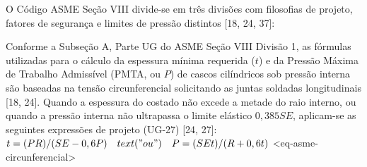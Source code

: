 O Código ASME Seção VIII divide-se em três divisões com filosofias de projeto, fatores de segurança e limites de pressão distintos [18, 24, 37]:

%
%
%
%
%

Conforme a Subseção A, Parte UG do ASME Seção VIII Divisão 1, as fórmulas utilizadas para o cálculo da espessura mínima requerida ($t$) e da Pressão Máxima de Trabalho Admissível (PMTA, ou $P$) de cascos cilíndricos sob pressão interna são baseadas na tensão circunferencial solicitando as juntas soldadas longitudinais [18, 24]. Quando a espessura do costado não excede a metade do raio interno, ou quando a pressão interna não ultrapassa o limite elástico $0,385 S E$, aplicam-se as seguintes expressões de projeto (UG-27) [24, 27]:
$ t = (P R) / (S E - 0,6 P) \quad text("ou") \quad P = (S E t) / (R + 0,6 t) $ <eq-asme-circunferencial>

